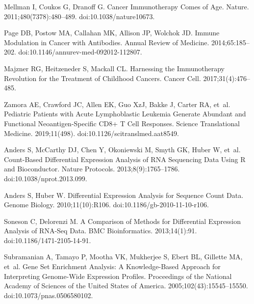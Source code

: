 \documentclass[10pt,letterpaper]{article}
\begin{document}
\begin{thebibliography}{10}
	Mellman I, Coukos G, Dranoff G.
	\newblock Cancer Immunotherapy Comes of Age.
	\newblock Nature. 2011;480(7378):480--489.
	\newblock doi:{10.1038/nature10673}.

	Page DB, Postow MA, Callahan MK, Allison JP, Wolchok JD.
	\newblock Immune Modulation in Cancer with Antibodies.
	\newblock Annual Review of Medicine. 2014;65:185--202.
	\newblock doi:{10.1146/annurev-med-092012-112807}.

	Majzner RG, Heitzeneder S, Mackall CL.
	\newblock Harnessing the Immunotherapy Revolution for the Treatment of
	Childhood Cancers.
	\newblock Cancer Cell. 2017;31(4):476--485.

	Zamora AE, Crawford JC, Allen EK, Guo XzJ, Bakke J, Carter RA, et~al.
	\newblock Pediatric Patients with Acute Lymphoblastic Leukemia Generate
	Abundant and Functional Neoantigen-Specific {{CD8}}+ {{T}} Cell Responses.
	\newblock Science Translational Medicine. 2019;11(498).
	\newblock doi:{10.1126/scitranslmed.aat8549}.

	Anders S, McCarthy DJ, Chen Y, Okoniewski M, Smyth GK, Huber W, et~al.
	\newblock Count-Based Differential Expression Analysis of {{RNA}} Sequencing
	Data Using {{R}} and {{Bioconductor}}.
	\newblock Nature Protocols. 2013;8(9):1765--1786.
	\newblock doi:{10.1038/nprot.2013.099}.

	Anders S, Huber W.
	\newblock Differential Expression Analysis for Sequence Count Data.
	\newblock Genome Biology. 2010;11(10):R106.
	\newblock doi:{10.1186/gb-2010-11-10-r106}.

	Soneson C, Delorenzi M.
	\newblock A Comparison of Methods for Differential Expression Analysis of
	{{RNA}}-Seq Data.
	\newblock BMC Bioinformatics. 2013;14(1):91.
	\newblock doi:{10.1186/1471-2105-14-91}.

	Subramanian A, Tamayo P, Mootha VK, Mukherjee S, Ebert BL, Gillette MA, et~al.
	\newblock Gene Set Enrichment Analysis: A Knowledge-Based Approach for
	Interpreting Genome-Wide Expression Profiles.
	\newblock Proceedings of the National Academy of Sciences of the United States
	of America. 2005;102(43):15545--15550.
	\newblock doi:{10.1073/pnas.0506580102}.


\end{thebibliography}
\end{document}
